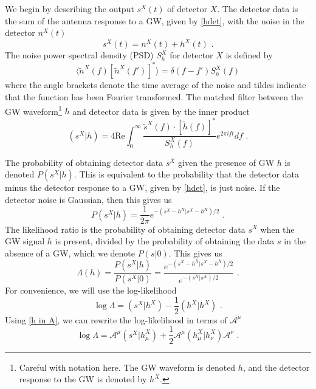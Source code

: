 \documentclass[11pt]{cuthesis}
\newcommand{\fs}{\text{ .}}
\begin{document}
We begin by describing the output $s^X(t)$ of detector $X$. The detector data is the sum of the antenna response to a GW, given by \ref{hdet}, with the noise in the detector $n^X(t)$
\begin{equation}
s^X(t) = n^X(t) + h^X(t) \fs
\end{equation}
The noise power spectral density (PSD) $S^X_h$ for detector $X$ is defined by
\begin{equation}
\langle \tilde{n}^X(f) [\tilde{n}^X(f')]^* \rangle = \delta (f-f') S^X_h(f)
\end{equation} 
where the angle brackets denote the time average of the noise and tildes indicate that the function has been Fourier transformed. The matched filter between the GW waveform\footnote{Careful with notation here. The GW waveform is denoted $h$, and the detector response to the GW is denoted by $h^X$.} $h$ and detector data is given by the inner product 
\begin{equation}
(s^X|h) = 4 \text{Re} \int^\infty_0 \frac{\tilde{s}^X(f) \cdot [\tilde{h}(f)]^*}{S^X_h (f)} e^{2\pi i ft}df \fs
\end{equation}

The probability of obtaining detector data $s^X$ given the presence of GW $h$ is denoted $P(s^X|h)$. This is equivalent to the probability that the detector data minus the detector response to a GW, given by \ref{hdet}, is just noise. If the detector noise is Gaussian, then this gives us
\begin{equation}
P(s^X|h) = \frac{1}{2\pi}  e^{-(s^X-h^X|s^X-h^X)/2} \fs
\end{equation}
The likelihood ratio is the probability of obtaining detector data $s^X$ when the GW signal $h$ is present, divided by the probability of obtaining the data $s$ in the absence of a GW, which we denote $P(s|0)$. This gives us
\begin{equation}
\Lambda (h) = \frac{P(s^X|h)}{P(s^X|0)} = \frac{e^{-(s^X-h^X|s^X-h^X)/2}}{e^{-(s^X|s^X)/2}} \fs
\end{equation}
For convenience, we will use the log-likelihood 
\begin{equation}
\log \Lambda = (s^X|h^X) - \frac{1}{2}(h^X|h^X) \fs
\end{equation}
Using \ref{h in A}, we can rewrite the log-likelihood in terms of $\mathcal{A}^\mu$
\begin{equation}
\log \Lambda = \mathcal{A}^\mu(s^X|h^X_\mu) + \frac{1}{2} \mathcal{A}^\mu (h^X_\mu | h^X_\nu) \mathcal{A}^\nu \fs
\end{equation}
\end{document}
